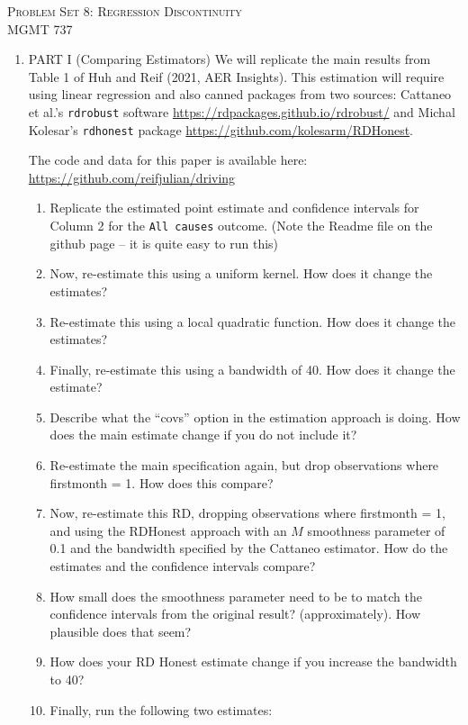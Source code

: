 \documentclass[11pt, a4paper]{article}
\begin{document}
\begin{center}
  {\Large \textsc{Problem Set 8: Regression Discontinuity}}\\
  MGMT 737
\end{center}
\begin{enumerate}
\item PART I (Comparing Estimators) We will replicate the main results
  from Table 1 of Huh and Reif (2021, AER Insights). This estimation
  will require using linear regression and also canned packages from
  two sources: Cattaneo et al.'s \texttt{rdrobust} software
  \url{https://rdpackages.github.io/rdrobust/} and Michal Kolesar's
  \texttt{rdhonest} package \url{https://github.com/kolesarm/RDHonest}.

  The code and data for this paper is available here: \url{https://github.com/reifjulian/driving}
  \begin{enumerate}
  \item Replicate the estimated point estimate and confidence
    intervals for Column 2 for the \texttt{All causes}
    outcome. (Note the Readme file on the github page -- it is quite
    easy to run this)
  \item Now, re-estimate this using a uniform kernel. How does it
    change the estimates?
  \item Re-estimate this using a local quadratic function. How does it
    change the estimates?
  \item Finally, re-estimate this using a bandwidth of 40. How does it
    change the estimate? 
  \item Describe what the ``covs'' option in the estimation approach
    is doing. How does the main estimate change if you do not include
    it?
  \item Re-estimate the main specification again, but drop
    observations where firstmonth = 1. How does this compare?
  \item Now, re-estimate this RD, dropping observations where
    firstmonth = 1, and using the RDHonest approach with an $M$
    smoothness parameter of 0.1 and the bandwidth specified by the
    Cattaneo estimator. How do the estimates and the confidence
    intervals compare?
  \item How small does the smoothness parameter need to be to match
    the confidence intervals from the original result?
    (approximately). How plausible does that seem?
  \item How does your RD Honest estimate change if you increase the
    bandwidth to 40?
  \item Finally, run the following two estimates:

\end{enumerate}
\end{enumerate}
\end{document}

